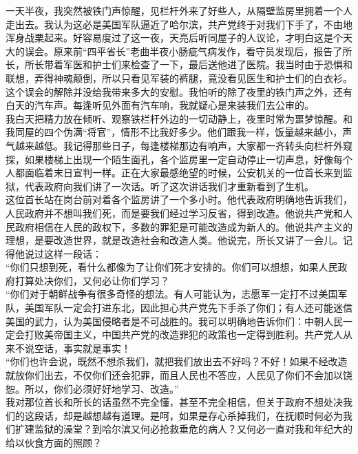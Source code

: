 一天半夜，我突然被铁门声惊醒，见栏杆外来了好些人，从隔壁监房里拥着一个人走出去。我认为这必是美国军队逼近了哈尔滨，共产党终于对我们下手了，不由地浑身战栗起来。好容易度过了这一夜，天亮后听同屋子的人议论，才明白这是个天大的误会。原来前“四平省长”老曲半夜小肠疵气病发作，看守员发现后，报告了所长，所长带着军医和护士们来检查了一下，最后送他进了医院。我当时由于恐惧和联想，弄得神魂颠倒，所以只看见军装的裤腿，竟没看见医生和护士们的白衣衫。\\

这个误会的解除并没给我带来多大的安慰。我怕听的除了夜里的铁门声之外，还有白天的汽车声。每逢听见外面有汽车响，我就疑心是来装我们去公审的。\\

我白天把精力放在倾听、观察铁栏杆外边的一切动静上，夜里时常为噩梦惊醒。和我同屋的四个伪满“将官”，情形不比我好多少。他们跟我一样，饭量越来越小，声气越来越低。我记得那些日子，每逢楼梯那边有响声，大家都一齐转头向栏杆外窥探，如果楼梯上出现一个陌生面孔，各个监房里一定自动停止一切声息，好像每个人都面临着末日宣判一样。正在大家最感绝望的时候，公安机关的一位首长来到监狱，代表政府向我们讲了一次话。听了这次讲话我们才重新看到了生机。\\

这位首长站在岗台前对着各个监房讲了一个多小时。他代表政府明确地告诉我们，人民政府并不想叫我们死，而是要我们经过学习反省，得到改造。他说共产党和人民政府相信在人民的政权下，多数的罪犯是可能改造成为新人的。他说共产主义的理想，是要改造世界，就是改造社会和改造人类。他说完，所长又讲了一会儿。记得他说过这样一段话：\\

“你们只想到死，看什么都像为了让你们死才安排的。你们可以想想，如果人民政府打算处决你们，又何必让你们学习？\\

“你们对于朝鲜战争有很多奇怪的想法。有人可能认为，志愿军一定打不过美国军队，美国军队一定会打进东北，因此担心共产党先下手杀了你们；有人还可能迷信美国的武力，认为美国侵略者是不可战胜的。我可以明确地告诉你们：中朝人民一定会打败美帝国主义，中国共产党的改造罪犯的政策也一定得到胜利。共产党人从来不说空话，事实就是事实！\\

“你们也许会说，既然不想杀我们，就把我们放出去不好吗？不好！如果不经改造就放你们出去，不仅你们还会犯罪，而且人民也不答应，人民见了你们不会加以饶恕。所以，你们必须好好地学习、改造。”\\

我对那位首长和所长的话虽然不完全懂，甚至不完全相信，但关于政府不想处决我们的这段话，却是越想越有道理。是呵，如果是存心杀掉我们，在抚顺时何必为我们扩建监狱的澡堂？到哈尔滨又何必抢救垂危的病人？又何必一直对我和年纪大的给以伙食方面的照顾？\\


